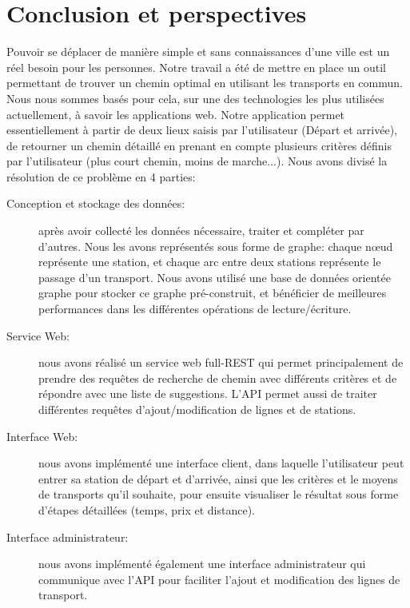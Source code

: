\chapter{Conclusion et perspectives}

Pouvoir se déplacer de manière simple et sans connaissances d'une ville est un réel besoin pour les personnes. Notre travail a été de mettre en place un outil permettant de trouver un chemin optimal en utilisant les transports en commun.
Nous nous sommes basés pour cela, sur une des technologies les plus utilisées actuellement, à savoir les applications web.\newline
Notre application permet essentiellement à partir de deux lieux saisis par l'utilisateur (Départ et arrivée), de retourner un chemin détaillé en prenant en compte plusieurs critères définis par l'utilisateur (plus court chemin, moins de marche...).\newline
Nous avons divisé la résolution de ce problème en 4 parties:

\begin{description}
\item[Conception et stockage des données:] après avoir collecté les données nécessaire, traiter et compléter par d'autres. Nous les avons représentés sous forme de graphe: chaque nœud représente une station, et chaque arc entre deux stations représente le passage d'un transport.\newline
Nous avons utilisé une base de données orientée graphe pour stocker ce graphe pré-construit, et bénéficier de meilleures performances dans les différentes opérations de lecture/écriture.
\item[Service Web:] nous avons réalisé un service web full-REST qui permet principalement de prendre des requêtes de recherche de chemin avec différents critères et de répondre avec une liste de suggestions. L'API permet aussi de traiter différentes requêtes d'ajout/modification de lignes et de stations.
\item[Interface Web:]  nous avons implémenté une interface client, dans laquelle l'utilisateur peut entrer sa station de départ et d'arrivée, ainsi que les critères et le moyens de transports qu'il souhaite, pour ensuite visualiser le résultat sous forme d'étapes détaillées (temps, prix et distance).

\item[Interface administrateur:] nous avons implémenté également une interface administrateur qui communique avec l'API pour faciliter l'ajout et modification des lignes de transport.

\end{description}


